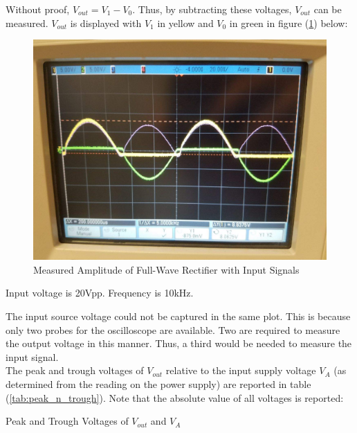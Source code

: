 Without proof, $V_{out} = V_1 - V_0$. Thus, by subtracting these voltages, $V_{out}$ can be measured. $V_{out}$ is displayed with $V_1$ in yellow and $V_0$ in green in figure (\ref{fig:measured_fwr_with_inputs}) below:

\FloatBarrier

\begin{figure}[h!]
	\centering
	\includegraphics[scale=0.25]{../images/full_wave_rectifier.PNG}
	\caption{Measured Amplitude of Full-Wave Rectifier with Input Signals}
	\label{fig:measured_fwr_with_inputs}
\end{figure}

\FloatBarrier

{\footnotesize Input voltage is 20\si{\volt}pp. Frequency is 10\si{\kilo\hertz}.}

\FloatBarrier

The input source voltage could not be captured in the same plot. This is because only two probes for the oscilloscope are available. Two are required to measure the output voltage in this manner. Thus, a third would be needed to measure the input signal. \\

The peak and trough voltages of $V_{out}$ relative to the input supply voltage $V_{A}$ (as determined from the reading on the power supply) are reported in table (\ref{tab:peak_n_trough}). Note that the absolute value of all voltages is reported:

\FloatBarrier

\begin{table}[h!]
	\centering
	\caption{Peak and Trough Voltages of $V_{out}$ and $V_{A}$}
	\label{tab:peak_n_trough}
\end{table}

